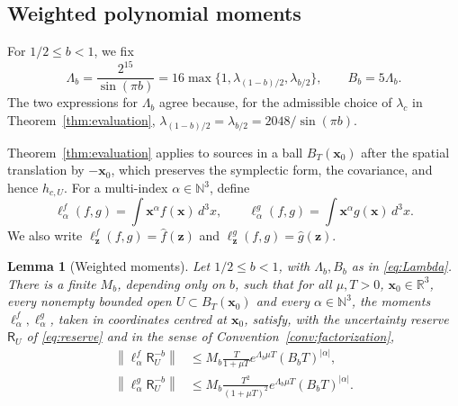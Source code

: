 \documentclass[11pt]{amsart}
\numberwithin{equation}{section}
\newtheorem{lemma}[theorem]{Lemma}
\theoremstyle{definition}
\newcommand{\R}{\mathbb R}
\newcommand{\N}{\mathbb N}
\newcommand{\Res}{\mathsf R}
\newcommand{\bx}{\mathbf x}
\newcommand{\bz}{\mathbf z}
\newcommand{\norm}[1]{\left\|#1\right\|}
\newcommand{\wh}[1]{\widehat{#1}}
\begin{document}
\subsection{Weighted polynomial moments}

For \(1/2\le b<1\), we fix
\begin{equation}
 \Lambda_b=\frac{2^{15}}{\sin(\pi b)}
 =16\max\{1,\lambda_{(1-b)/2},\lambda_{b/2}\},
 \qquad B_b=5\Lambda_b.
 \label{eq:Lambda}
\end{equation}
The two expressions for \(\Lambda_b\) agree because, for the admissible
choice of \(\lambda_c\) in Theorem~\ref{thm:evaluation},
\(\lambda_{(1-b)/2}=\lambda_{b/2}=2048/{\sin(\pi b)}\).

Theorem~\ref{thm:evaluation} applies to sources in a ball
\(B_T(\bx_0)\) after the spatial translation by \(-\bx_0\), which
preserves the symplectic form, the covariance, and hence
\(h_{c,U}\).
For a multi-index \(\alpha\in\N^3\), define
\[
 \ell_\alpha^f(f,g)=\int\bx^\alpha f(\bx)\,d^3x,\qquad
 \ell_\alpha^g(f,g)=\int\bx^\alpha g(\bx)\,d^3x.
\]
We also write
\(\ell_{\bz}^f(f,g)=\wh f(\bz)\) and
\(\ell_{\bz}^g(f,g)=\wh g(\bz)\).

\begin{lemma}[Weighted moments]\label{lem:moments}
Let \(1/2\le b<1\), with \(\Lambda_b,B_b\) as in \eqref{eq:Lambda}.
There is a finite \(M_b\), depending only on \(b\), such that for all
\(\mu,T>0\), \(\bx_0\in\R^3\), every nonempty bounded open
\(U\subset B_T(\bx_0)\) and every \(\alpha\in\N^3\), the moments
\(\ell_\alpha^f,\ell_\alpha^g\), taken in coordinates centred at
\(\bx_0\), satisfy, with the uncertainty reserve \(\Res_U\) of
\eqref{eq:reserve} and in the sense of
Convention~\ref{conv:factorization},
\begin{align}
 \norm{\ell_\alpha^f\Res_U^{-b}}
 &\le M_b\frac{T}{1+\mu T}
      e^{\Lambda_b\mu T}(B_bT)^{|\alpha|},
 \label{eq:f-moments}\\
 \norm{\ell_\alpha^g\Res_U^{-b}}
 &\le M_b\frac{T^2}{(1+\mu T)^2}
      e^{\Lambda_b\mu T}(B_bT)^{|\alpha|}.
 \label{eq:g-moments}
\end{align}
\end{lemma}
\end{document}
